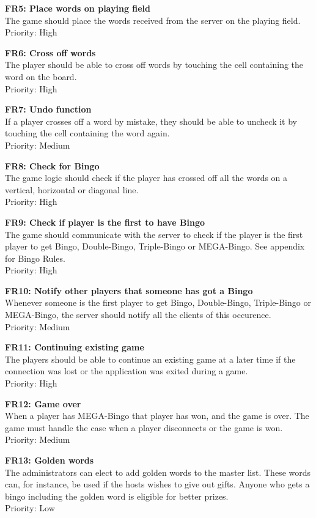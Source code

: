 {\bf FR5: Place words on playing field}\\
The game should place the words received from the server on the playing
field.\\
Priority: High

{\bf FR6: Cross off words}\\
The player should be able to cross off words by touching the cell containing
the word on the board.\\
Priority: High

{\bf FR7: Undo function}\\
If a player crosses off a word by mistake, they should be able to uncheck it by
touching the cell containing the word again.\\
Priority: Medium

{\bf FR8: Check for Bingo}\\
The game logic should check if the player has crossed off all the words on a
vertical, horizontal or diagonal line.\\
Priority: High

{\bf FR9: Check if player is the first to have Bingo}\\
The game should communicate with the server to check if the player is the first
player to get Bingo, Double-Bingo, Triple-Bingo or MEGA-Bingo. See appendix for
Bingo Rules.\\
Priority: High

{\bf FR10: Notify other players that someone has got a Bingo}\\
Whenever someone is the first player to get Bingo, Double-Bingo, Triple-Bingo
or MEGA-Bingo, the server should notify all the clients of this occurence.\\
Priority: Medium


{\bf FR11: Continuing existing game}\\
The players should be able to continue an existing game at a later time if the
connection was lost or the application was exited during a game.\\
Priority: High

{\bf FR12: Game over}\\
When a player has MEGA-Bingo that player has won, and the game is over. The
game must handle the case when a player disconnects or the game is won.\\
Priority: Medium


{\bf FR13: Golden words}\\
The administrators can elect to add golden words to the master list. These
words can, for instance, be used if the hosts wishes to give out gifts. Anyone
who gets a bingo including the golden word is eligible for better prizes.\\
Priority: Low
